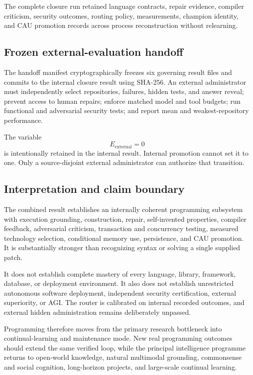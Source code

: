 The complete closure run retained language contracts, repair evidence,
compiler criticism, security outcomes, routing policy, measurements, champion
identity, and CAU promotion records across process reconstruction without
relearning.


\subsection{Frozen external-evaluation handoff}
\label{subsec:programming-external-handoff}

The handoff manifest cryptographically freezes six governing result files and
commits to the internal closure result using SHA-256.  An external
administrator must independently select repositories, failures, hidden tests,
and answer reveal; prevent access to human repairs; enforce matched model and
tool budgets; run functional and adversarial security tests; and report mean
and weakest-repository performance.

The variable
\begin{equation}
E_{\mathrm{external}}=0
\end{equation}
is intentionally retained in the internal result.  Internal promotion cannot
set it to one.  Only a source-disjoint external administrator can authorize
that transition.


\subsection{Interpretation and claim boundary}
\label{subsec:programming-closure-boundary}

The combined result establishes an internally coherent programming subsystem
with execution grounding, construction, repair, self-invented properties,
compiler feedback, adversarial criticism, transaction and concurrency testing,
measured technology selection, conditional memory use, persistence, and CAU
promotion.  It is substantially stronger than recognizing syntax or solving a
single supplied patch.

It does not establish complete mastery of every language, library, framework,
database, or deployment environment.  It also does not establish unrestricted
autonomous software deployment, independent security certification, external
superiority, or AGI.  The router is calibrated on internal recorded outcomes,
and external hidden administration remains deliberately unpassed.

Programming therefore moves from the primary research bottleneck into
continual-learning and maintenance mode.  New real programming outcomes should
extend the same verified loop, while the principal intelligence programme
returns to open-world knowledge, natural multimodal grounding, commonsense and
social cognition, long-horizon projects, and large-scale continual learning.
